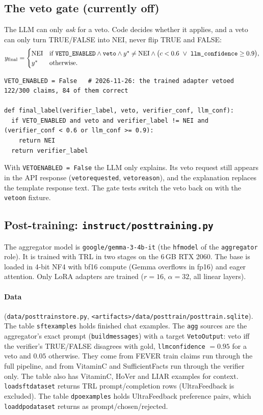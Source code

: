 \documentclass[11pt,a4paper]{article}
\makeatletter
\DeclareRobustCommand{\_}{\ifmmode\nfss@text{\textunderscore}\else\textunderscore\allowbreak\fi}
\newcommand{\file}[1]{\texttt{#1}}
\newcommand{\NEI}{\textup{NEI}}
\makeatother
\begin{document}
\subsection{The veto gate (currently off)}

The LLM can only \emph{ask} for a veto. Code decides whether it applies, and a veto can only turn TRUE/FALSE into
\NEI, never flip TRUE and FALSE:
\[
  y_\text{final} =
  \begin{cases}
    \NEI & \text{if } \texttt{VETO\_ENABLED} \wedge \texttt{veto} \wedge y^\ast\neq\NEI \wedge
           \big(c < 0.6 \ \vee\ \texttt{llm\_confidence}\ge 0.9\big),\\
    y^\ast & \text{otherwise.}
  \end{cases}
\]
\begin{lstlisting}
VETO_ENABLED = False   # 2026-11-26: the trained adapter vetoed 122/300 claims, 84 of them correct

def final_label(verifier_label, veto, verifier_conf, llm_conf):
  if VETO_ENABLED and veto and verifier_label != NEI and (verifier_conf < 0.6 or llm_conf >= 0.9):
    return NEI
  return verifier_label
\end{lstlisting}
With \texttt{VETO\_ENABLED = False} the LLM only explains. Its veto request still appears in the API response
(\texttt{veto\_requested}, \texttt{veto\_reason}), and the explanation replaces the template response text. The
gate tests switch the veto back on with the \texttt{veto\_on} fixture.

\subsection{Post-training: \file{instruct/posttraining.py}}

The aggregator model is \texttt{google/gemma-3-4b-it} (the \texttt{hf\_model} of the \texttt{aggregator} role). It is
trained with TRL in two stages on the 6\,GB RTX 2060. The base is loaded in 4-bit NF4 with bf16 compute (Gemma
overflows in fp16) and eager attention. Only LoRA adapters are trained ($r=16$, $\alpha=32$, all linear layers).

\paragraph{Data} (\file{data/posttrain\_store.py}, \file{<artifacts>/data/posttrain/posttrain.sqlite}).
The table \texttt{sft\_examples} holds finished chat examples. The \texttt{agg\_*} sources are the aggregator's exact
prompt (\texttt{build\_messages}) with a target \texttt{VetoOutput}: veto iff the verifier's TRUE/FALSE disagrees with
gold, \texttt{llm\_confidence} $=0.95$ for a veto and $0.05$ otherwise. They come from FEVER train claims run through the
full pipeline, and from VitaminC and SufficientFacts run through the verifier only. The table also has VitaminC,
HoVer and LIAR examples for context. \texttt{load\_sft\_dataset} returns TRL prompt/completion rows (UltraFeedback is
excluded). The table \texttt{dpo\_examples} holds UltraFeedback preference pairs, which \texttt{load\_dpo\_dataset}
returns as prompt/chosen/rejected.
\end{document}
